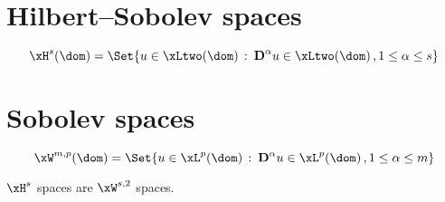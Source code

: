 \section{Hilbert--Sobolev spaces}\label{sec:Hspace}

\begin{equation*}
\xH^s(\dom) = \Set{ u \in \xLtwo(\dom)\,:\: \D^\alpha u \in \xLtwo(\dom)\,, 1 \leq \alpha \leq s }
\end{equation*}

\section{Sobolev spaces}

\begin{equation*}
\xW^{m,p}(\dom) = \Set{ u \in \xL^p(\dom)\,:\: \D^\alpha u \in \xL^p(\dom)\,, 1 \leq \alpha \leq m }
\end{equation*}

\begin{rmrk}
$\xH^s$ spaces are $\xW^{s,2}$ spaces.
\end{rmrk}

